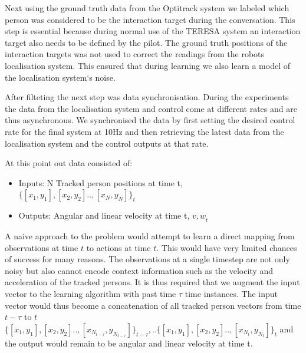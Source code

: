 \documentclass[a4paper,11pt]{report}
\begin{document}
Next using the ground truth data from the Optitrack system we labeled which person was considered to be the interaction target during the conversation. This step is essential because during normal use of the TERESA system an interaction target also needs to be defined by the pilot. The ground truth positions of the interaction targets was not used to correct the readings from the robots localisation system. This ensured that during learning we also learn a model of the localisation system`s noise. 

After filteting the next step was data synchronisation. During the experiments the data from the localisation system and control come at different rates and are thus asynchronous. We synchronised the data by first setting the desired control rate for the final system at 10Hz and then retrieving the latest data from the localisation system and the control outputs at that rate.   

At this point out data consisted of:
\begin{itemize}
	\item Inputs: N Tracked person positions at time t, $\{[x_1,y_1],[x_2,y_2] .., [x_N,y_N]\}_t$
	\item Outputs: Angular and linear velocity at time t, ${v,w}_t$
\end{itemize}

A naive approach to the problem would attempt to learn a direct mapping from observations at time $t$ to actions at time $t$. This would have very limited chances of success for many reasons. The observations at a single timestep are not only noisy but also cannot encode context information such as the velocity and acceleration of the tracked persons. It is thus required that we augment the input vector to the learning algorithm with past time $\tau$ time instances. The input vector would thus become a concatenation of all tracked person vectors from time $t- \tau$ to $t$ $\{[x_1,y_1],[x_2,y_2] .., [x_{N_{t-\tau}},y_{N_{t-\tau}}]\}_{t-\tau},.. \{[x_1,y_1],[x_2,y_2] .., [x_{N_t},y_{N_t}]\}_t$ and the output would remain to be angular and linear velocity at time t.
\end{document}
